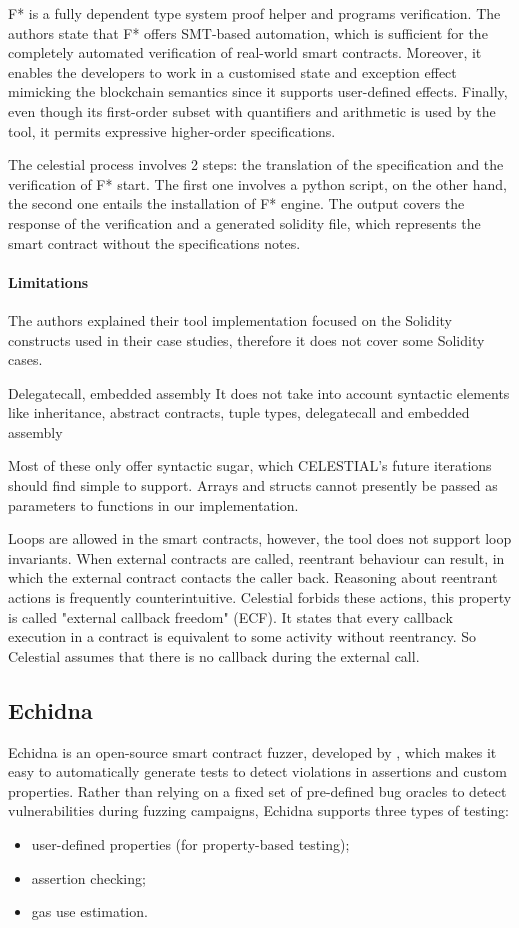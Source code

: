 F* is a fully dependent type system proof helper and programs verification. 
The authors state that F* offers SMT-based automation, which is sufficient for the completely automated verification of real-world smart contracts. 
Moreover, it enables the developers to work in a customised state and exception effect mimicking the blockchain semantics since it supports user-defined effects. 
Finally, even though its first-order subset with quantifiers and arithmetic is used by the tool, it permits expressive higher-order specifications.

The celestial process involves 2 steps: the translation of the specification and the verification of F* start. 
The first one involves a python script, on the other hand, the second one entails the installation of F* engine. 
The output covers the response of the verification and a generated solidity file, which represents the smart contract without the specifications notes. 

\paragraph{Limitations} 
The authors explained their tool implementation focused on the Solidity constructs used in their case studies, therefore it does not cover some Solidity cases. 

Delegatecall, embedded assembly
It does not take into account syntactic elements like inheritance, abstract contracts, tuple types, delegatecall and  embedded assembly

Most of these only offer syntactic sugar, which CELESTIAL's future iterations should find simple to support.
Arrays and structs cannot presently be passed as parameters to functions in our implementation. 

Loops are allowed in the smart contracts, however, the tool does not support loop invariants.
When external contracts are called, reentrant behaviour can result, in which the external contract contacts the caller back.
Reasoning about reentrant actions is frequently counterintuitive.
Celestial forbids these actions, this property is called "external callback freedom" (ECF). It states that every callback execution 
in a contract is equivalent to some activity without reentrancy.
So Celestial assumes that there is no callback during the external call.

\subsection{Echidna}
\label{sec:Specification:Echidna}
Echidna is an open-source smart contract fuzzer, developed by \citet{Echidna}, which makes it easy to automatically generate tests to detect violations in
assertions and custom properties.
Rather than relying on a fixed set of pre-defined bug oracles to detect vulnerabilities
during fuzzing campaigns, Echidna supports three types of testing: 
\begin{itemize}
    \item user-defined properties (for property-based testing);
    \item assertion checking;
    \item gas use estimation.
\end{itemize}

